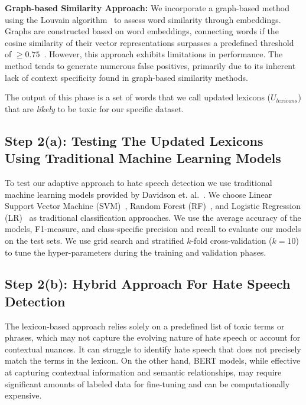 \noindent\textbf{Graph-based Similarity Approach:} We incorporate a graph-based method using the Louvain algorithm~\cite{blondel2008fast} to assess word similarity through embeddings. Graphs are constructed based on word embeddings, connecting words if the cosine similarity of their vector representations surpasses a predefined threshold of $\geq 0.75$~\cite{zannettou2020quantitative}.
However, this approach exhibits limitations in performance. The method tends to generate numerous false positives, primarily due to its inherent lack of context specificity found in graph-based similarity methods.

The output of this phase is a set of words that we call updated lexicons ($U_{lexicons}$) that are \textit{likely} to be toxic for our specific dataset.

\subsection{Step 2(a): Testing The Updated Lexicons Using Traditional Machine Learning Models}

To test our adaptive approach to hate speech detection we use traditional machine learning models provided by Davidson et. al.~\cite{davidson2017automated}.
We choose Linear Support Vector Machine (SVM)~\cite{cortes1995support}, Random Forest (RF)~\cite{breiman2001random}, and Logistic Regression (LR)~\cite{hosmer2013applied} as traditional classification approaches.
We use the average accuracy of the models, F1-measure, and class-specific precision and recall to evaluate our models on the test sets.
We use grid search and stratified $k$-fold cross-validation ($k=10$) to tune the hyper-parameters during the training and validation phases.

\subsection{Step 2(b): Hybrid Approach For Hate Speech Detection}

The lexicon-based approach relies solely on a predefined list of toxic terms or phrases, which may not capture the evolving nature of hate speech or account for contextual nuances.
It can struggle to identify hate speech that does not precisely match the terms in the lexicon.
On the other hand, BERT models, while effective at capturing contextual information and semantic relationships, may require significant amounts of labeled data for fine-tuning and can be computationally expensive.

